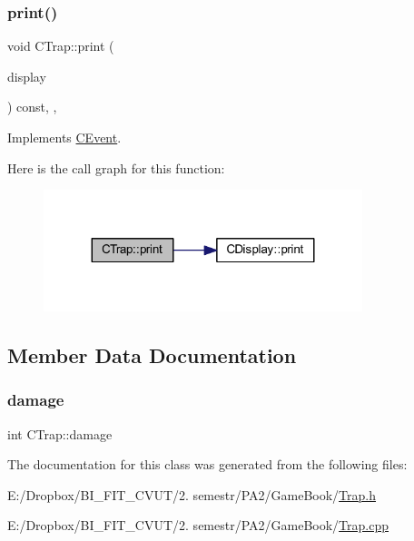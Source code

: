 \subsubsection{\texorpdfstring{print()}{print()}}
{\footnotesize\ttfamily void C\+Trap\+::print (\begin{DoxyParamCaption}\item[{const \mbox{\hyperlink{class_c_display}{C\+Display}} \&}]{display }\end{DoxyParamCaption}) const\hspace{0.3cm}{\ttfamily [inline]}, {\ttfamily [override]}, {\ttfamily [virtual]}}



Implements \mbox{\hyperlink{class_c_event_ad6f75aa0babcd74caff9426cecdd86f0}{C\+Event}}.

Here is the call graph for this function\+:\nopagebreak
\begin{figure}[H]
\begin{center}
\leavevmode
\includegraphics[width=263pt]{class_c_trap_a64aba41bb1f7578d10e347358273acf4_cgraph}
\end{center}
\end{figure}


\subsection{Member Data Documentation}
\mbox{\label{class_c_trap_a491913fea694bfc0cf03a41421073dea}} 
\subsubsection{\texorpdfstring{damage}{damage}}
{\footnotesize\ttfamily int C\+Trap\+::damage\hspace{0.3cm}{\ttfamily [protected]}}



The documentation for this class was generated from the following files\+:\begin{DoxyCompactItemize}
\item 
E\+:/\+Dropbox/\+B\+I\+\_\+\+F\+I\+T\+\_\+\+C\+V\+U\+T/2. semestr/\+P\+A2/\+Game\+Book/\mbox{\hyperlink{_trap_8h}{Trap.\+h}}\item 
E\+:/\+Dropbox/\+B\+I\+\_\+\+F\+I\+T\+\_\+\+C\+V\+U\+T/2. semestr/\+P\+A2/\+Game\+Book/\mbox{\hyperlink{_trap_8cpp}{Trap.\+cpp}}\end{DoxyCompactItemize}
